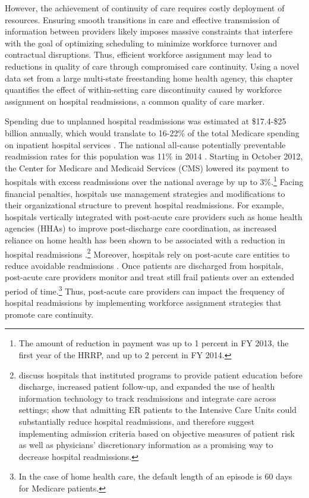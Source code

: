 \documentclass[final,12pt, notitlepage]{article}
\begin{document}
However, the achievement of continuity of care requires costly deployment of resources. Ensuring smooth transitions in care and effective transmission of information between providers likely imposes massive constraints that interfere with the goal of optimizing scheduling to minimize workforce turnover and contractual disruptions. Thus, efficient workforce assignment may lead to reductions in quality of care through compromised care continuity. Using a novel data set from a large multi-state freestanding home health agency, this chapter quantifies the effect of within-setting care discontinuity caused by workforce assignment on hospital readmissions, a common quality of care marker.

Spending due to unplanned hospital readmissions was estimated at \$17.4-\$25 billion annually, which would translate to 16-22\% of the total Medicare spending on inpatient hospital services \citep{PricewaterhouseCooper2008, Jencks2009}.
The national all-cause potentially preventable readmission rates for this population was 11\% in 2014 \citep{MedPAC2016medicare}.
Starting in October 2012, the Center for Medicare and Medicaid Services (CMS) lowered its payment to hospitals with excess readmissions over the national average by up to 3\%.\footnote{The amount of reduction in payment was up to 1 percent in FY 2013, the first year of the HRRP, and up to 2 percent in FY 2014.}
Facing financial penalties, hospitals use management strategies and modifications to their organizational structure to prevent hospital readmissions.
For example, hospitals vertically integrated with post-acute care providers such as home health agencies (HHAs) to improve post-discharge care coordination, as increased reliance on home health has been shown to be associated with a reduction in hospital readmissions \citep{Polsky2014}.\footnote{\citet{Naylor1999} discuss hospitals that instituted programs to provide patient education before discharge, increased patient follow-up, and expanded the use of health information technology to track readmissions and integrate care across settings; \citet{Kim2015} show that admitting ER patients to the Intensive Care Units could substantially reduce hospital readmissions, and therefore suggest implementing admission criteria based on objective measures of patient risk as well as physicians' discretionary information as a promising way to decrease hospital readmissions.
}
Moreover, hospitals rely on post-acute care entities to reduce avoidable readmissions \citep{Naylor2012}. Once patients are discharged from hospitals, post-acute care providers monitor and treat still frail patients over an extended period of time.\footnote{In the case of home health care, the default length of an episode is 60 days for Medicare patients.
}
Thus, post-acute care providers can impact the frequency of hospital readmissions by implementing workforce assignment strategies that promote care continuity.
\end{document}
